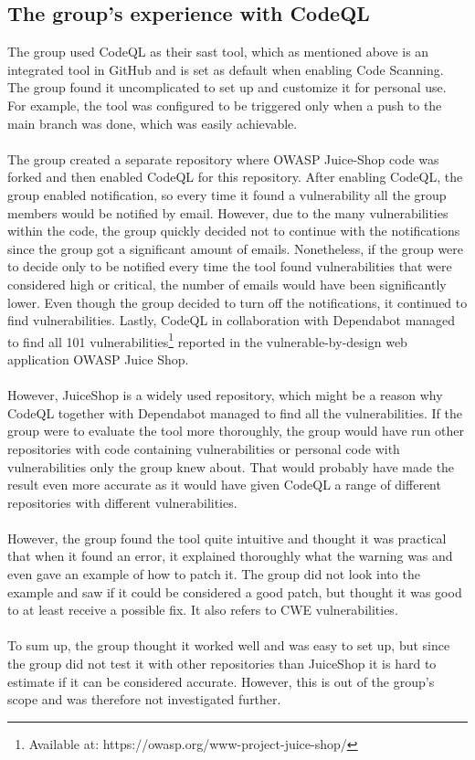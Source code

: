 \subsection{The group's experience with CodeQL}
The group used CodeQL as their \acrshort{sast} tool, which as mentioned above is an integrated tool in GitHub and is set as default when enabling Code Scanning. The group found it uncomplicated to set up and customize it for personal use. For example, the tool was configured to be triggered only when a push to the main branch was done, which was easily achievable. 
\\~\\
The group created a separate repository where OWASP Juice-Shop code was forked and then enabled CodeQL for this repository. After enabling CodeQL, the group enabled notification, so every time it found a vulnerability all the group members would be notified by email. However, due to the many vulnerabilities within the code, the group quickly decided not to continue with the notifications since the group got a significant amount of emails. Nonetheless, if the group were to decide only to be notified every time the tool found vulnerabilities that were considered high or critical, the number of emails would have been significantly lower. Even though the group decided to turn off the notifications, it continued to find vulnerabilities. Lastly, CodeQL in collaboration with Dependabot managed to find all 101 vulnerabilities\footnote{Available at: https://owasp.org/www-project-juice-shop/} reported in the vulnerable-by-design web application OWASP Juice Shop. 
\\~\\
However, JuiceShop is a widely used repository, which might be a reason why CodeQL together with Dependabot managed to find all the vulnerabilities. If the group were to evaluate the tool more thoroughly, the group would have run other repositories with code containing vulnerabilities or personal code with vulnerabilities only the group knew about. That would probably have made the result even more accurate as it would have given CodeQL a range of different repositories with different vulnerabilities.
\\~\\
However, the group found the tool quite intuitive and thought it was practical that when it found an error, it explained thoroughly what the warning was and even gave an example of how to patch it. The group did not look into the example and saw if it could be considered a good patch, but thought it was good to at least receive a possible fix. It also refers to CWE vulnerabilities. 
\\~\\
To sum up, the group thought it worked well and was easy to set up, but since the group did not test it with other repositories than JuiceShop it is hard to estimate if it can be considered accurate. However, this is out of the group's scope and was therefore not investigated further. 



